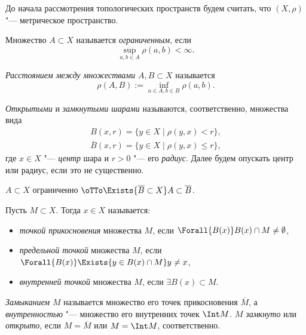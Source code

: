 \documentclass[main]{subfiles}
\begin{document}
До начала рассмотрения топологических пространств будем считать,
что \( (X, \rho) \) "--- метрическое пространство.
  
\begin{definition}
  Множество \( A \subset X \) называется \emph{ограниченным},
  если
  \[ \sup_{a, b \in A} \rho(a, b) < \infty. \]
\end{definition}

\begin{definition}
  \emph{Расстоянием между множествами} \( A, B \subset X \)
  называется
  \[ \rho(A, B) := \inf_{a \in A, b \in B} \rho(a, b). \]
\end{definition}

\begin{definition}
  \emph{Открытыми} и \emph{замкнутыми шарами} называются, соответственно, множества вида
  \begin{gather}
    B(x, r) = \{ y \in X \mid \rho(y, x) < r \}, \\
    \overline{B}(x, r) = \{ y \in X \mid \rho(y, x) \le r \},
  \end{gather}
  где \( x \in X \) "--- \emph{центр} шара и \( r > 0 \) "--- его \emph{радиус}.
  Далее будем опускать центр или радиус, если это не существенно.
\end{definition}

\begin{exercise}
  \( A \subset X \) ограниченно \( \oTTo \Exists{\overline{B} \subset X}
  A \subset \overline{B} \).
\end{exercise}

\begin{definition}
  Пусть \( M \subset X \). Тогда \( x \in X \) называется:
  \begin{itemize}
    \item \emph{точкой прикосновения} множества \( M \), если
      \( \Forall{B(x)} B(x) \cap M \ne \emptyset \),
    \item \emph{предельной точкой} множества \( M \),
      если \( \Forall{B(x)} \Exists{y \in B(x) \cap M} y \ne x \),
    \item \emph{внутренней точкой} множества \( M \),
      если \( \exists B(x) \subset M \).
  \end{itemize}
  \emph{Замыканием} \( M \) называется множество его точек прикосновения
  \( \overline{M} \), а \emph{внутренностью} "--- множество его внутренних
  точек \( \Int M \). \( M \) \emph{замкнуто} или \emph{открыто},
  если \( M = \overline{M} \) или \( M = \Int M \), соответственно.
\end{definition}
\end{document}
